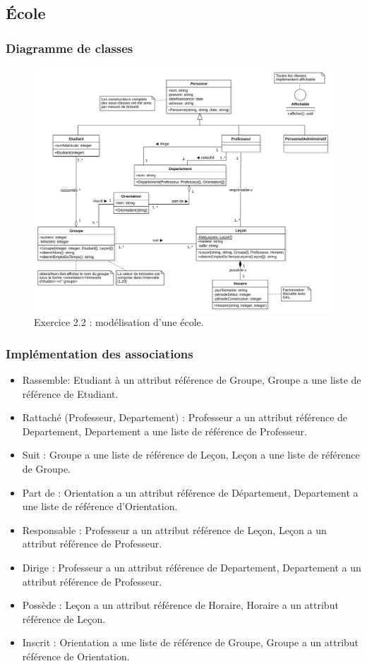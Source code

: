 \documentclass{article}
\begin{document}
\pagebreak
\subsection{École}
\subsubsection{Diagramme de classes}
\begin{figure}[!htb]
    \centering
    \includegraphics[width=1\textwidth]{./images/2-2_ecole.png}
    \caption{Exercice 2.2 : modélisation d'une école.}
\end{figure}

\subsubsection{Implémentation des associations}
\begin{itemize}
\item Rassemble: Etudiant à un attribut référence de Groupe, Groupe a une liste de référence de Etudiant.
\item Rattaché (Professeur, Departement) : Professeur a un attribut référence de Departement, Departement a une liste de référence de Professeur.
\item Suit : Groupe a une liste de référence de Leçon, Leçon a une liste de référence de Groupe.
\item Part de : Orientation a un attribut référence de Département, Departement a une liste de référence d'Orientation.
\item Responsable : Professeur a un attribut référence de Leçon, Leçon a un attribut référence de Professeur.
\item Dirige : Professeur a un attribut référence de Departement, Departement a un attribut référence de Professeur.
\item Possède : Leçon a un attribut référence de Horaire, Horaire a un attribut référence de Leçon.
\item Inscrit : Orientation a une liste de référence de Groupe, Groupe a un attribut référence de Orientation.
\end{itemize}
\end{document}
